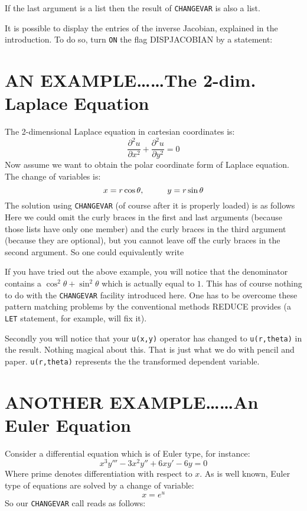 If the last argument is a list then the result of {\tt CHANGEVAR} is also a
list.

It is possible to display the entries of the inverse Jacobian, explained
in the introduction.  To do so, turn {\tt ON} the flag {DISPJACOBIAN} by a
statement: 

\section{AN EXAMPLE\ldots\ldots The 2-dim. Laplace Equation}
The 2-dimensional Laplace equation in cartesian coordinates is:
\[
   \frac{\partial^{2} u}{\partial x^{2}} +
   \frac{\partial^{2} u}{\partial y^{2}} = 0
\]
Now assume we want to obtain the polar coordinate form of Laplace equation.
The change of variables is:
\[
   x = r \cos \theta, \;\;\;\;\;\;\;\;\;\;  y = r \sin \theta
\]
The solution using {\tt CHANGEVAR}  (of course after it is properly loaded)
is as follows
Here we could omit the curly braces in the first and last arguments (because
those lists have only one member) and the curly braces in the third argument
(because they are optional), but you cannot leave off the curly braces in the
second argument. So one could equivalently write

If you have tried out the above example, you will notice that the denominator
contains a $\cos^{2} \theta + \sin^{2} \theta$ which is actually equal to $1$.
This has of course nothing to do with the {\tt CHANGEVAR} facility introduced
here.  One has to be overcome these pattern matching problems by the
conventional methods REDUCE provides (a {\tt LET} statement, for example,
will fix it).

Secondly you will notice that your {\tt u(x,y)} operator has changed to
{\tt u(r,theta)} in the result. Nothing magical  about this. That is just what
we do with pencil and paper. {\tt u(r,theta)} represents the  the transformed
dependent variable.

\section{ANOTHER EXAMPLE\ldots\ldots An Euler Equation}
Consider a differential equation which is of Euler type, for instance:
\[
   x^{3}y''' - 3 x^{2}y'' + 6 x y' - 6 y = 0
\]
Where prime denotes differentiation with respect to $x$. As is well known,
Euler type of equations are solved by a change of variable:
\[
   x = e^{u}
\]
So our  {\tt CHANGEVAR} call reads as follows:





